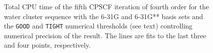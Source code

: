 \documentclass[prl,twocolumn,showpacs,twocolumngrid,superbib]{revtex4}
\begin{document}
{\begin{figure}[h]
  \caption{\protect
    Total CPU time of the fifth CPSCF iteration of fourth order for
    the water cluster sequence with the 6-31G and 6-31G** 
    basis sets and the {\tt GOOD} and {\tt TIGHT} 
    numerical thresholds (see text) controlling numerical
    precision of the result. The lines are fits to the 
    last three and four points, respectively.
  }\label{fig:Gamma_scaling}
\end{figure}

}
\end{document}
